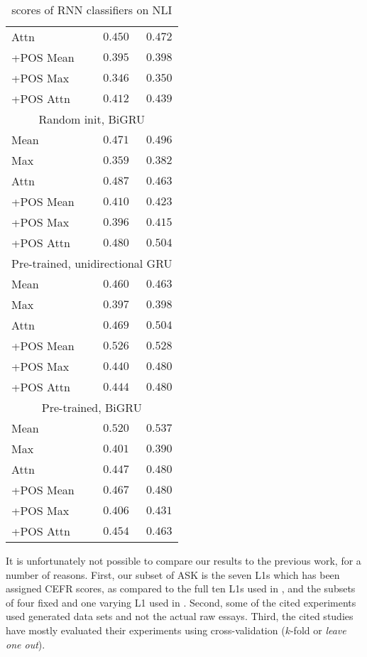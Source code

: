 \begin{table}
\begin{tabular}{lrr}
    Attn & $0.450$ & $0.472$ \\
    +POS Mean & $0.395$ & $0.398$ \\
    +POS Max & $0.346$ & $0.350$ \\
    +POS Attn & $0.412$ & $0.439$ \\
    \midrule \multicolumn{3}{c}{Random init, BiGRU} \\ \midrule
    Mean & $0.471$ & $0.496$ \\
    Max & $0.359$ & $0.382$ \\
    Attn & $0.487$ & $0.463$ \\
    +POS Mean & $0.410$ & $0.423$ \\
    +POS Max & $0.396$ & $0.415$ \\
    +POS Attn & $0.480$ & $0.504$ \\
    \midrule \multicolumn{3}{c}{Pre-trained, unidirectional GRU} \\ \midrule
    Mean & $0.460$ & $0.463$ \\
    Max & $0.397$ & $0.398$ \\
    Attn & $0.469$ & $0.504$ \\
    +POS Mean & $\mathbf{0.526}$ & $0.528$ \\
    +POS Max & $0.440$ & $0.480$ \\
    +POS Attn & $0.444$ & $0.480$ \\
    \midrule \multicolumn{3}{c}{Pre-trained, BiGRU} \\ \midrule
    Mean & $0.520$ & $\mathbf{0.537}$ \\
    Max & $0.401$ & $0.390$ \\
    Attn & $0.447$ & $0.480$ \\
    +POS Mean & $0.467$ & $0.480$ \\
    +POS Max & $0.406$ & $0.431$ \\
    +POS Attn & $0.454$ & $0.463$ \\
    \bottomrule
  \end{tabular}
  \caption{\FI scores of RNN classifiers on NLI}
  \label{tab:rnn-nli-results}
\end{table}

It is unfortunately not possible to compare our results to the previous work,
for a number of reasons. First, our subset of ASK is the seven \acp{L1} which
has been assigned CEFR scores, as compared to the full ten \acp{L1} used in
\autocite{malmasi15,malmasi17,malmasi2018native}, and the subsets of four fixed
and one varying \ac{L1} used in \autocite{pepper2012,ionescu2016string}. Second,
some of the cited experiments used generated data sets and not the actual raw
essays. Third, the cited studies have mostly evaluated their experiments using
cross-validation ($k$-fold or \emph{leave one out}).

